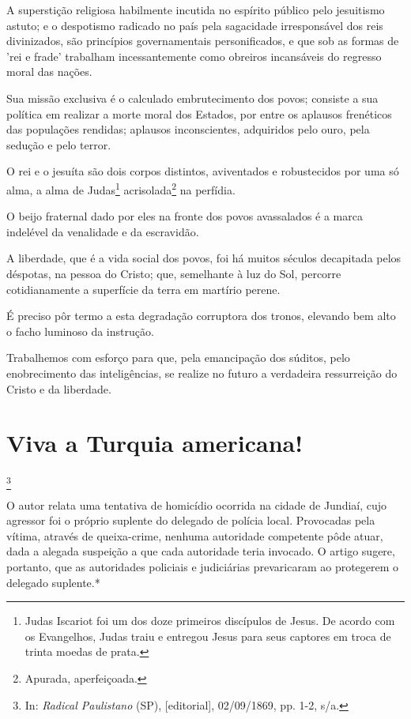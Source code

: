 A superstição religiosa habilmente incutida no espírito público pelo
jesuitismo astuto; e o despotismo radicado no país pela sagacidade
irresponsável dos reis divinizados, são princípios governamentais
personificados, e que sob as formas de 'rei e frade' trabalham
incessantemente como obreiros incansáveis do regresso moral das nações.

Sua missão exclusiva é o calculado embrutecimento dos povos; consiste a
sua política em realizar a morte moral dos Estados, por entre os
aplausos frenéticos das populações rendidas; aplausos inconscientes,
adquiridos pelo ouro, pela sedução e pelo terror.

O rei e o jesuíta são dois corpos distintos, aviventados e robustecidos
por uma só alma, a alma de Judas\footnote{Judas Iscariot foi um dos
  doze primeiros discípulos de Jesus. De acordo com os Evangelhos, Judas
  traiu e entregou Jesus para seus captores em troca de trinta moedas de
  prata.} acrisolada\footnote{Apurada, aperfeiçoada.} na perfídia.

O beijo fraternal dado por eles na fronte dos povos avassalados é a
marca indelével da venalidade e da escravidão.

A liberdade, que é a vida social dos povos, foi há muitos séculos
decapitada pelos déspotas, na pessoa do Cristo; que, semelhante à luz do
Sol, percorre cotidianamente a superfície da terra em martírio perene.

É preciso pôr termo a esta degradação corruptora dos tronos, elevando
bem alto o facho luminoso da instrução.

Trabalhemos com esforço para que, pela emancipação dos súditos, pelo
enobrecimento das inteligências, se realize no futuro a verdadeira
ressurreição do Cristo e da liberdade.

\chapter{Viva a Turquia americana!}\footnote{In: \emph{Radical Paulistano}
  (SP), {[}editorial{]}, 02/09/1869, pp. 1-2, s/a.}

\begin{didascalia}
O autor relata uma tentativa de homicídio ocorrida na cidade de Jundiaí,
cujo agressor foi o próprio suplente do delegado de polícia local.
Provocadas pela vítima, através de queixa-crime, nenhuma autoridade
competente pôde atuar, dada a alegada suspeição a que cada autoridade
teria invocado. O artigo sugere, portanto, que as autoridades policiais
e judiciárias prevaricaram ao protegerem o delegado suplente.*
\end{didascalia}

